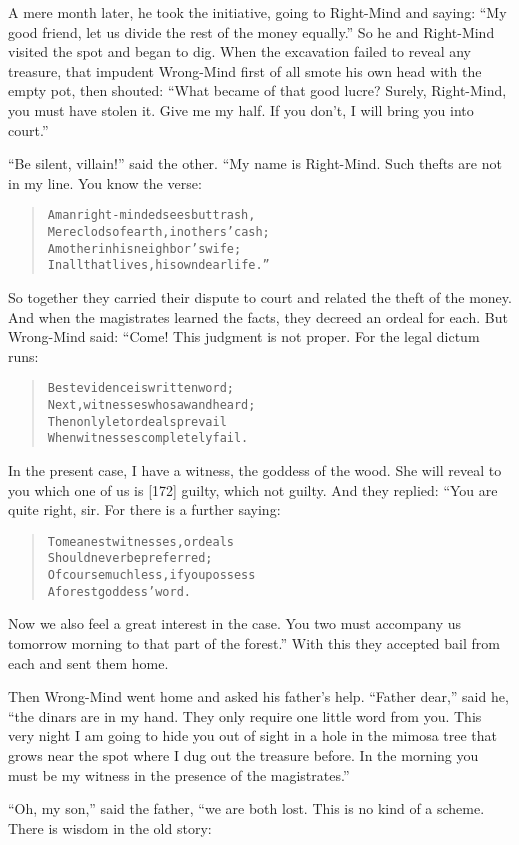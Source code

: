 \documentclass[article, twoside, 14pt]{memoir}
\renewenvironment{verbatim}{%
\begin{quote}%
\vskip -10pt%
\begin{alltt}\normalfont\large}{\end{alltt}%
\end{quote}%
\vskip -10pt
} %
\begin{document}
A mere month later, he took the initiative, going to Right-Mind and
saying:
``My good friend, let us divide the rest of the money equally.'' So
he and Right-Mind visited the spot and began to dig. When the
excavation failed to reveal any treasure, that impudent Wrong-Mind
first of all smote his own head with the empty pot, then shouted:
``What became of that good lucre? Surely, Right-Mind, you must have stolen it. Give me my half. If you don't, I will bring you into court.''

``Be silent, villain!'' said the other. “My name is Right-Mind.
Such thefts are not in my line. You know the verse:

\begin{verbatim}
A man right-minded sees but trash,
Mere clods of earth, in others' cash;
A mother in his neighbor's wife;
In all that lives, his own dear life.”
\end{verbatim}
So together they carried their dispute to court and related the
theft of the money. And when the magistrates learned the facts,
they decreed an ordeal for each. But Wrong-Mind said: “Come! This
judgment is not proper. For the legal dictum runs:

\begin{verbatim}
Best evidence is written word;
Next, witnesses who saw and heard;
Then only let ordeals prevail
When witnesses completely fail.
\end{verbatim}
In the present case, I have a witness, the goddess of the wood. She
will reveal to you which one of us is [172] guilty, which not
guilty. And they replied: “You are quite right, sir. For there is a
further saying:

\begin{verbatim}
To meanest witnesses, ordeals
    Should never be preferred;
Of course much less, if you possess
    A forest goddess' word.
\end{verbatim}
Now we also feel a great interest in the case. You two must
accompany us tomorrow morning to that part of the forest.” With
this they accepted bail from each and sent them home.

Then Wrong-Mind went home and asked his father's help.
``Father dear,'' said he,
``the dinars are in my hand. They only require one little word from you. This very night I am going to hide you out of sight in a hole in the mimosa tree that grows near the spot where I dug out the treasure before. In the morning you must be my witness in the presence of the magistrates.''

``Oh, my son,'' said the father, “we are both lost. This is no kind
of a scheme. There is wisdom in the old story:
\end{document}
